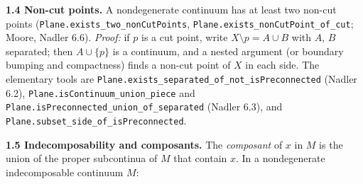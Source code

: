\documentclass[11pt]{article}
\newcommand{\lean}[1]{\texttt{#1}}
\begin{document}
\textbf{1.4 Non-cut points.} A nondegenerate continuum has at least two non-cut points (\lean{Plane.\hspace{0pt}exists\_\hspace{0pt}two\_\hspace{0pt}nonCutPoints}, \lean{Plane.\hspace{0pt}exists\_\hspace{0pt}nonCutPoint\_\hspace{0pt}of\_\hspace{0pt}cut}; Moore, Nadler 6.6). \emph{Proof:} if $p$ is a cut point, write $X \setminus p = A \cup B$ with $A$, $B$ separated; then $A \cup \{p\}$ is a continuum, and a nested argument (or boundary bumping and compactness) finds a non-cut point of $X$ in each side. The elementary tools are \lean{Plane.\hspace{0pt}exists\_\hspace{0pt}separated\_\hspace{0pt}of\_\hspace{0pt}not\_\hspace{0pt}isPreconnected} (Nadler 6.2), \lean{Plane.\hspace{0pt}isContinuum\_\hspace{0pt}union\_\hspace{0pt}piece} and \lean{Plane.\hspace{0pt}isPreconnected\_\hspace{0pt}union\_\hspace{0pt}of\_\hspace{0pt}separated} (Nadler 6.3), and \lean{Plane.\hspace{0pt}subset\_\hspace{0pt}side\_\hspace{0pt}of\_\hspace{0pt}isPreconnected}.

\textbf{1.5 Indecomposability and composants.} The \emph{composant} of $x$ in $M$ is the union of the proper subcontinua of $M$ that contain $x$. In a nondegenerate indecomposable continuum $M$:
\end{document}
